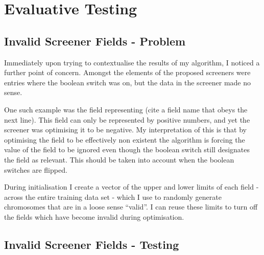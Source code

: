 \section{Evaluative Testing}
\subsection{Invalid Screener Fields - Problem}
Immediately upon trying to contextualise the results of my algorithm, I noticed a further point of concern. Amongst the elements of the proposed screeners were entries where the boolean switch was on, but the data in the screener made no sense. \newline

One such example was the field representing (cite a field name that obeys the next line). This field can only be represented by positive numbers, and yet the screener was optimising it to be negative. My interpretation of this is that by optimising the field to be effectively non existent the algorithm is forcing the value of the field to be ignored even though the boolean switch still designates the field as relevant. This should be taken into account when the boolean switches are flipped. \newline

During initialisation I create a vector of the upper and lower limits of each field - across the entire training data set - which I use to randomly generate chromosomes that are in a loose sense ``valid''. I can reuse these limits to turn off the fields which have become invalid during optimisation. \newline

\subsection{Invalid Screener Fields - Testing}